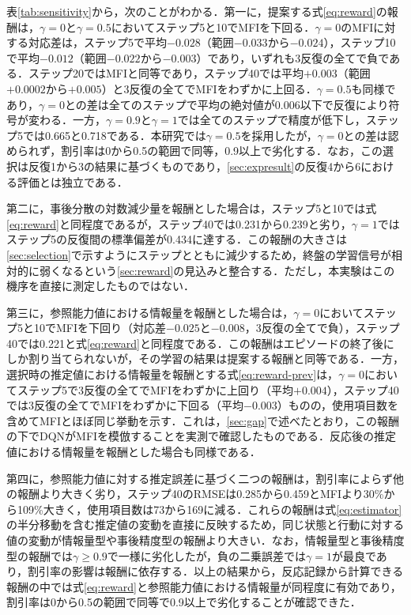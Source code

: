 \documentclass[a4paper,12pt,oneside,openany]{jsbook}
\begin{document}
表\ref{tab:sensitivity}から，次のことがわかる．第一に，提案する式\eqref{eq:reward}の報酬は，$\gamma=0$と$\gamma=0.5$においてステップ5と10でMFIを下回る．$\gamma=0$のMFIに対する対応差は，ステップ5で平均$-0.028$（範囲$-0.033$から$-0.024$），ステップ10で平均$-0.012$（範囲$-0.022$から$-0.003$）であり，いずれも3反復の全てで負である．ステップ20ではMFIと同等であり，ステップ40では平均$+0.003$（範囲$+0.0002$から$+0.005$）と3反復の全てでMFIをわずかに上回る．$\gamma=0.5$も同様であり，$\gamma=0$との差は全てのステップで平均の絶対値が0.006以下で反復により符号が変わる．一方，$\gamma=0.9$と$\gamma=1$では全てのステップで精度が低下し，ステップ5では0.665と0.718である．本研究では$\gamma=0.5$を採用したが，$\gamma=0$との差は認められず，割引率は0から0.5の範囲で同等，0.9以上で劣化する．なお，この選択は反復1から3の結果に基づくものであり，\ref{sec:expresult}の反復4から6における評価とは独立である．

第二に，事後分散の対数減少量を報酬とした場合は，ステップ5と10では式\eqref{eq:reward}と同程度であるが，ステップ40では0.231から0.239と劣り，$\gamma=1$ではステップ5の反復間の標準偏差が0.434に達する．この報酬の大きさは\ref{sec:selection}で示すようにステップとともに減少するため，終盤の学習信号が相対的に弱くなるという\ref{sec:reward}の見込みと整合する．ただし，本実験はこの機序を直接に測定したものではない．

第三に，参照能力値における情報量を報酬とした場合は，$\gamma=0$においてステップ5と10でMFIを下回り（対応差$-0.025$と$-0.008$，3反復の全てで負），ステップ40では0.221と式\eqref{eq:reward}と同程度である．この報酬はエピソードの終了後にしか割り当てられないが，その学習の結果は提案する報酬と同等である．一方，選択時の推定値における情報量を報酬とする式\eqref{eq:reward-prev}は，$\gamma=0$においてステップ5で3反復の全てでMFIをわずかに上回り（平均$+0.004$），ステップ40では3反復の全てでMFIをわずかに下回る（平均$-0.003$）ものの，使用項目数を含めてMFIとほぼ同じ挙動を示す．これは，\ref{sec:gap}で述べたとおり，この報酬の下でDQNがMFIを模倣することを実測で確認したものである．反応後の推定値における情報量を報酬とした場合も同様である．

第四に，参照能力値に対する推定誤差に基づく二つの報酬は，割引率によらず他の報酬より大きく劣り，ステップ40のRMSEは0.285から0.459とMFIより30\%から109\%大きく，使用項目数は73から169に減る．これらの報酬は式\eqref{eq:estimator}の半分移動を含む推定値の変動を直接に反映するため，同じ状態と行動に対する値の変動が情報量型や事後精度型の報酬より大きい．なお，情報量型と事後精度型の報酬では$\gamma\ge0.9$で一様に劣化したが，負の二乗誤差では$\gamma=1$が最良であり，割引率の影響は報酬に依存する．以上の結果から，反応記録から計算できる報酬の中では式\eqref{eq:reward}と参照能力値における情報量が同程度に有効であり，割引率は0から0.5の範囲で同等で0.9以上で劣化することが確認できた．
\end{document}
